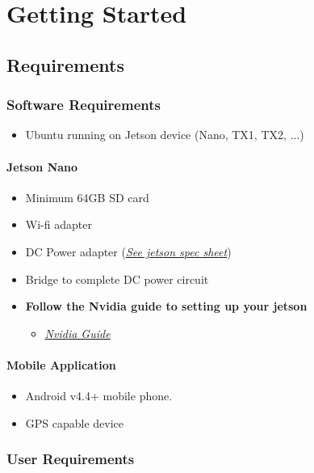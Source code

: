 \chapter{Getting Started}

\section{Requirements}
\subsection{Software Requirements}

\begin{itemize}
    \item Ubuntu running on Jetson device (Nano, TX1, TX2, ...)
\end{itemize}

\subsubsection{Jetson Nano}
\begin{itemize}
    \item Minimum 64GB SD card
    \item Wi-fi adapter
    \item DC Power adapter (\href{https://www.docdroid.net/yGXIxZu/data-sheet-nvidia-jetson-tx2-system-on-module.pdf}{\textit{See jetson spec sheet}})
    \item Bridge to complete DC power circuit

    \item \textbf{Follow the Nvidia guide to setting up your jetson}
        \begin{itemize}
            \item \href{https://developer.nvidia.com/embedded/learn/get-started-jetson-nano-devkit}{\textit{\underline{Nvidia Guide}}}
        \end{itemize}
\end{itemize}

\subsubsection{Mobile Application} 
\begin{itemize}
		\item Android v4.4+ mobile phone.
		\item GPS capable device
\end{itemize}

\subsection{User Requirements}

